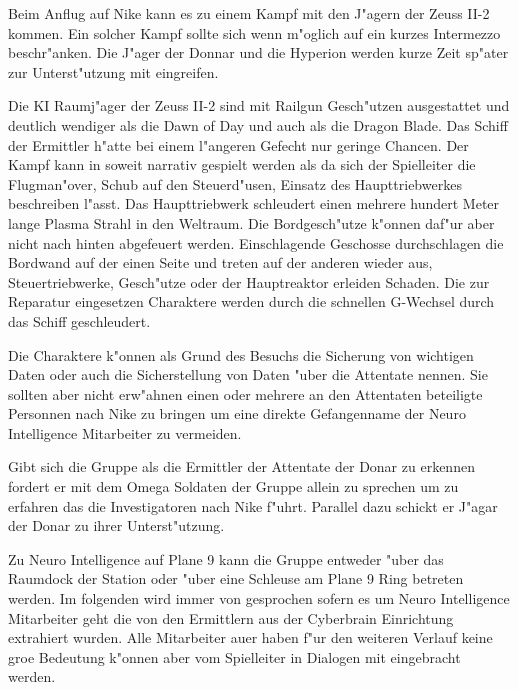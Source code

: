 \begin{remarks}
	Beim Anflug auf Nike kann es zu einem Kampf mit den J"agern der Zeuss II-2 kommen. Ein solcher Kampf sollte sich wenn m"oglich auf ein kurzes Intermezzo beschr"anken. Die J"ager der Donnar und die Hyperion werden kurze Zeit sp"ater zur Unterst"utzung mit eingreifen. 
	
	Die KI Raumj"ager der Zeuss II-2 sind mit Railgun Gesch"utzen ausgestattet und deutlich wendiger als die Dawn of Day und auch als die Dragon Blade. Das Schiff der Ermittler h"atte bei einem l"angeren Gefecht nur geringe Chancen. Der Kampf kann in soweit narrativ gespielt werden als da\3 sich der Spielleiter die Flugman"over, Schub auf den Steuerd"usen, Einsatz des Haupttriebwerkes beschreiben l"asst. Das Haupttriebwerk schleudert einen mehrere hundert Meter lange Plasma Strahl in den Weltraum. Die Bordgesch"utze k"onnen daf"ur aber nicht nach hinten abgefeuert werden. Einschlagende Geschosse durchschlagen die Bordwand auf der einen Seite und treten auf der anderen wieder aus, Steuertriebwerke, Gesch"utze oder der Hauptreaktor erleiden Schaden. Die zur Reparatur eingesetzen Charaktere werden durch die schnellen G-Wechsel durch das Schiff geschleudert.

	Die Charaktere k"onnen als Grund des Besuchs die Sicherung von wichtigen Daten oder auch die Sicherstellung von Daten "uber die Attentate nennen. Sie sollten aber nicht erw"ahnen einen oder mehrere an den Attentaten beteiligte Personnen nach Nike zu bringen um eine direkte Gefangenname der Neuro Intelligence Mitarbeiter zu vermeiden.

	Gibt sich die Gruppe als die Ermittler der Attentate der Donar zu erkennen fordert er mit dem Omega Soldaten der Gruppe allein zu sprechen um zu erfahren das die Investigatoren nach Nike f"uhrt. Parallel dazu schickt er J"agar der Donar zu ihrer Unterst"utzung.
\end{remarks}


Zu Neuro Intelligence auf Plane 9 kann die Gruppe entweder "uber das Raumdock der Station oder "uber eine Schleuse am Plane 9 Ring betreten werden. Im folgenden wird immer von \ml{} gesprochen sofern es um Neuro Intelligence Mitarbeiter geht die von den Ermittlern aus der Cyberbrain Einrichtung extrahiert wurden. Alle Mitarbeiter au\3er \ml{} haben f"ur den weiteren Verlauf keine gro\3e Bedeutung k"onnen aber vom Spielleiter in Dialogen mit eingebracht werden.

